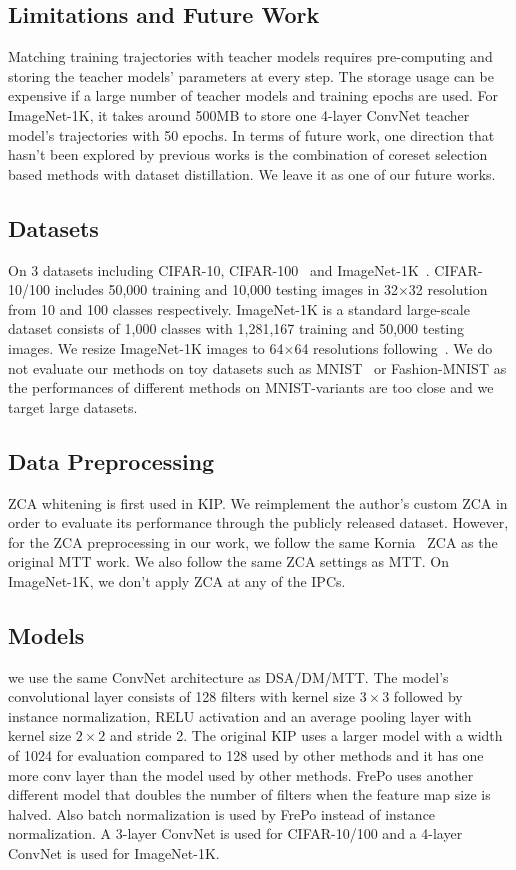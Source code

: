 \documentclass[10pt,twocolumn,letterpaper]{article}
\begin{document}
\subsection{Limitations and Future Work} 
Matching training trajectories with teacher models requires pre-computing and storing the teacher models' parameters at every step. The storage usage can be expensive if a large number of teacher models and training epochs are used. For ImageNet-1K, it takes around 500MB to store one 4-layer ConvNet teacher model's trajectories with 50 epochs. In terms of future work, one direction that hasn't been explored by previous works is the combination of coreset selection based methods with dataset distillation. We leave it as one of our future works.

\subsection{Datasets}
\label{sec.appendix.datasets}
On 3 datasets including CIFAR-10, CIFAR-100~\cite{krizhevsky2009learning} and ImageNet-1K~\cite{russakovsky2015imagenet}. CIFAR-10/100 includes 50,000 training and 10,000 testing images in 32$\times$32 resolution from 10 and 100 classes respectively. ImageNet-1K is a standard large-scale dataset consists of 1,000 classes with 1,281,167 training and 50,000 testing images. We resize ImageNet-1K images to 64$\times$64 resolutions following~\cite{zhou2022dataset}.
We do not evaluate our methods on toy datasets such as MNIST~\cite{lecun1998gradient} or Fashion-MNIST\cite{xiao2017fashion} as the performances of different methods on MNIST-variants are too close and we target large datasets. 

\subsection{Data Preprocessing}
ZCA whitening is first used in KIP. We reimplement the author's custom ZCA in order to evaluate its performance through the publicly released dataset. However, for the ZCA preprocessing in our work, we follow the same Kornia~\cite{EdgarRiba2019KorniaAO} ZCA as the original MTT work. We also follow the same ZCA settings as MTT. On ImageNet-1K, we don't apply ZCA at any of the IPCs.

\subsection{Models}
we use the same ConvNet architecture as DSA/DM/MTT. The model's convolutional layer consists of 128 filters with kernel size $3\times 3$ followed by instance normalization\cite{ulyanov2016instance}, RELU activation and an average pooling layer with kernel size $2\times 2$ and stride 2. The original KIP uses a larger model with a width of 1024 for evaluation compared to 128 used by other methods and it has one more conv layer than the model used by other methods. FrePo uses another different model that doubles the number of filters when the feature map size is halved. Also batch normalization is used by FrePo instead of instance normalization. A 3-layer ConvNet is used for CIFAR-10/100 and a 4-layer ConvNet is used for ImageNet-1K.
\end{document}

